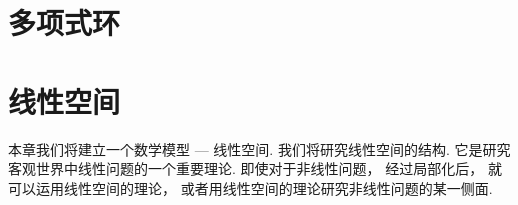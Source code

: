 \chapter{多项式环}













\chapter{线性空间}
本章我们将建立一个数学模型 --- 线性空间.
我们将研究线性空间的结构.
它是研究客观世界中线性问题的一个重要理论.
即使对于非线性问题，
经过局部化后，
就可以运用线性空间的理论，
或者用线性空间的理论研究非线性问题的某一侧面.



